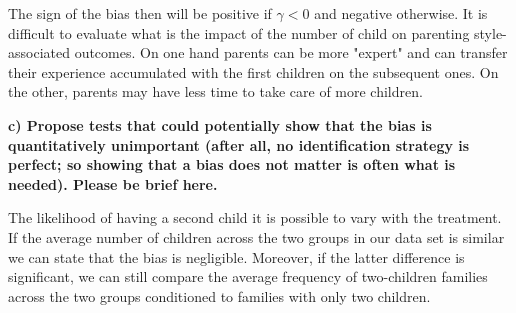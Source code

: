 \documentclass[a4paper,12pt,oneside,English]{article}
\begin{document}
The sign of the bias then will be positive if $\gamma<0$ and negative otherwise. It is difficult to evaluate what is the impact of the number of child on parenting style-associated outcomes. On one hand parents can be more "expert" and can transfer their experience accumulated with the first children on the subsequent ones. On the other, parents may have less time to take care of more children.

\textbf{c) Propose tests that could potentially show that the bias is quantitatively unimportant (after all, no identification strategy is perfect; so showing that a bias does not matter is often what is needed). Please be brief here.}

The likelihood of having a second child it is possible to vary with the treatment. If the average number of children across the two groups in our data set is similar we can state that the bias is negligible. Moreover, if the latter difference is significant, we can still compare the average frequency of two-children families across the two groups conditioned to families with only two children. 
\end{document}
